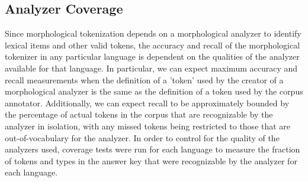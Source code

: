 \subsection{Analyzer Coverage}
Since morphological tokenization depends on a morphological analyzer to identify lexical items and other valid tokens, the accuracy and recall of the morphological tokenizer in any particular language is dependent on the qualities of the analyzer available for that language. In particular, we can expect maximum accuracy and recall measurements when the definition of a 'token' used by the creator of a morphological analyzer is the same as the definition of a token used by the corpus annotator. Additionally, we can expect recall to be approximately bounded by the percentage of actual tokens in the corpus that are recognizable by the analyzer in isolation, with any missed tokens being restricted to those that are out-of-vocabulary for the analyzer.
In order to control for the quality of the analyzers used, coverage tests were run for each language to measure the fraction of tokens and types in the answer key that were recognizable by the analyzer for each language.

